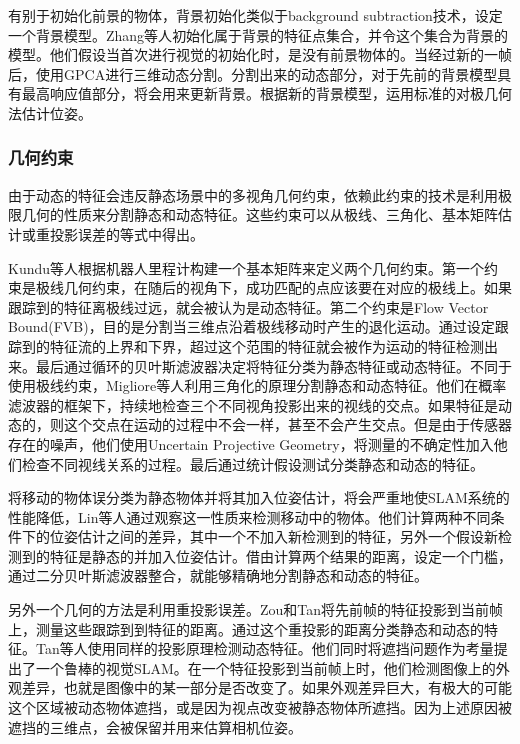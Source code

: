 有别于初始化前景的物体，背景初始化类似于background subtraction技术，设定一个背景模型\cite{Babaee2017A,Piccardi2005Background}。Zhang等人\cite{Zhang2012Visual}初始化属于背景的特征点集合，并令这个集合为背景的模型。他们假设当首次进行视觉的初始化时，是没有前景物体的。当经过新的一帧后，使用GPCA\cite{Ren2005Generalized}进行三维动态分割。分割出来的动态部分，对于先前的背景模型具有最高响应值部分，将会用来更新背景。根据新的背景模型，运用标准的对极几何法估计位姿。

\subsubsection{几何约束}
由于动态的特征会违反静态场景中的多视角几何约束，依赖此约束的技术是利用极限几何的性质\cite{Hartley2008Multiple}来分割静态和动态特征。这些约束可以从极线、三角化、基本矩阵估计或重投影误差的等式中得出。

Kundu等人\cite{kundu2009movingA}根据机器人里程计构建一个基本矩阵来定义两个几何约束。第一个约束是极线几何约束，在随后的视角下，成功匹配的点应该要在对应的极线上。如果跟踪到的特征离极线过远，就会被认为是动态特征。第二个约束是Flow Vector Bound(FVB)，目的是分割当三维点沿着极线移动时产生的退化运动。通过设定跟踪到的特征流的上界和下界，超过这个范围的特征就会被作为运动的特征检测出来。最后通过循环的贝叶斯滤波器决定将特征分类为静态特征或动态特征。不同于使用极线约束，Migliore等人\cite{Migliore2009Use}利用三角化的原理分割静态和动态特征。他们在概率滤波器的框架下，持续地检查三个不同视角投影出来的视线的交点。如果特征是动态的，则这个交点在运动的过程中不会一样，甚至不会产生交点。但是由于传感器存在的噪声，他们使用Uncertain Projective Geometry\cite{Heuel2001Matching}，将测量的不确定性加入他们检查不同视线关系的过程。最后通过统计假设测试分类静态和动态的特征。

将移动的物体误分类为静态物体并将其加入位姿估计，将会严重地使SLAM系统的性能降低，Lin等人\cite{Wang2007Simultaneous}通过观察这一性质来检测移动中的物体。他们计算两种不同条件下的位姿估计之间的差异，其中一个不加入新检测到的特征，另外一个假设新检测到的特征是静态的并加入位姿估计。借由计算两个结果的距离，设定一个门槛，通过二分贝叶斯滤波器整合，就能够精确地分割静态和动态的特征。

另外一个几何的方法是利用重投影误差。Zou和Tan\cite{Danping2013CoSLAM}将先前帧的特征投影到当前帧上，测量这些跟踪到到特征的距离。通过这个重投影的距离分类静态和动态的特征。Tan等人\cite{Wei2013Robust}使用同样的投影原理检测动态特征。他们同时将遮挡问题作为考量提出了一个鲁棒的视觉SLAM。在一个特征投影到当前帧上时，他们检测图像上的外观差异，也就是图像中的某一部分是否改变了。如果外观差异巨大，有极大的可能这个区域被动态物体遮挡，或是因为视点改变被静态物体所遮挡。因为上述原因被遮挡的三维点，会被保留并用来估算相机位姿。


